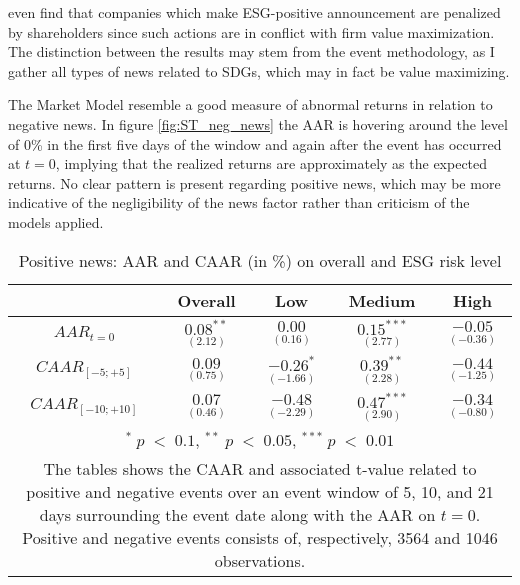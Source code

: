\cite{fisher2011voluntary} even find that companies which make ESG-positive announcement are penalized by shareholders since such actions are in conflict with firm value maximization. The distinction between the results may stem from the event methodology, as I gather all types of news related to SDGs, which may in fact be value maximizing. 

The Market Model resemble a good measure of abnormal returns in relation to negative news. In figure \ref{fig:ST_neg_news} the AAR is hovering around the level of 0\% in the first five days of the window and again after the event has occurred at $t = 0$, implying that the realized returns are approximately as the expected returns. No clear pattern is present regarding positive news, which may be more indicative of the negligibility of the news factor rather than criticism of the models applied.   

\begin{table}[H]
\centering
\caption{Positive news: AAR and CAAR (in \%) on overall and ESG risk level} 
\begin{tabular}{ccccc}
  \hline  \hline
  & \multicolumn{1}{c}{Overall} &  \multicolumn{1}{c}{Low} & \multicolumn{1}{c}{Medium} & \multicolumn{1}{c}{High}\\  
 \hline
$AAR_{t=0}$ &  $\underset{(2.12)}{0.08^{**}}$ & $\underset{(0.16)}{0.00}$ & $\underset{(2.77)}{0.15^{***}}$ &  $\underset{(-0.36)}{-0.05}$ \\ 
$CAAR_{[-5;+5]}$  & $\underset{(0.75)}{0.09}$ &  $\underset{(-1.66)}{-0.26^{*}}$ &  $\underset{(2.28)}{0.39^{**}}$ &  $\underset{(-1.25)}{-0.44}$ \\ 
$CAAR_{[-10;+10]}$    & $\underset{(0.46)}{0.07}$ &  $\underset{(-2.29)}{-0.48}$ &  $\underset{(2.90)}{0.47^{***}}$ &  $\underset{(-0.80)}{-0.34}$ \\ 
    \hline \hline
   \multicolumn{5}{p{10cm}}{ \footnotesize $^* \; p\; <\; 0.1$, $ ^{**} \; p\; <\; 0.05$, $ ^{***} \; p\; <\; 0.01$  } \\
   \multicolumn{5}{p{10cm}}{\footnotesize The tables shows the CAAR and associated t-value related to positive and negative events over an event window of 5, 10, and 21 days surrounding the event date along with the AAR on $t=0$. Positive and negative events consists of, respectively, 3564 and 1046 observations. } \\
   \hline
\end{tabular}
\label{tab: ST_pos_significance}
\end{table}

